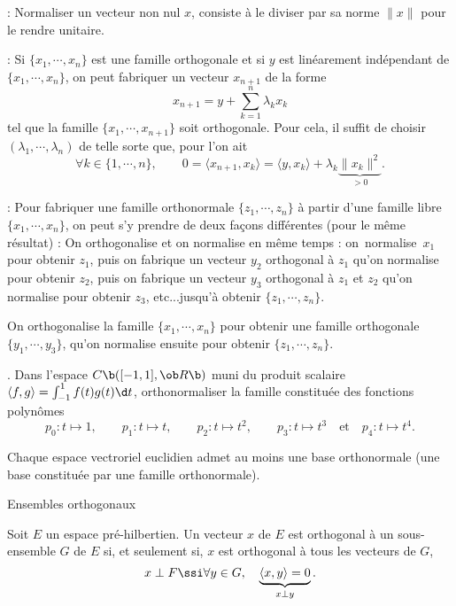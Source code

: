  : Normaliser un vecteur non nul $x$, consiste \`a le diviser par sa norme $\|x\|$ pour le rendre unitaire. 
\bigskip

: Si $\{x_1,\cdots,x_n\}$ est une famille orthogonale et si $y$ est lin\'earement ind\'ependant de $\{x_1,\cdots,x_n\}$, on peut fabriquer un vecteur $x_{n+1}$ de la forme 
$$
x_{n+1}=y+\sum_{k=1}^n\lambda_kx_k
$$ 
tel que la famille $\{x_1,\cdots,x_{n+1}\}$ soit orthogonale. Pour cela, il suffit de choisir $(\lambda_1,\cdots,\lambda_n)$ de telle sorte que, pour l'on ait
$$
\forall k\in\{1,\cdots,n\}, \qquad 0=\langle x_{n+1},x_k\rangle=\langle y,x_k\rangle+\lambda_k\underbrace{\|x_k\|^2}_{>0}.
$$

 : Pour fabriquer une famille orthonormale $\{z_1,\cdots,z_n\}$ \`a partir d'une famille libre $\{x_1,\cdots,x_n\}$, 
on peut s'y prendre de deux fa\c cons diff\'erentes (pour le m\^eme r\'esultat) :
\medskip
\noindent
{}
On orthogonalise et on normalise en m\^eme temps : on~normalise~$x_1$ pour obtenir $z_1$, puis on fabrique un vecteur $y_2$ orthogonal \`a $z_1$ qu'on normalise pour obtenir $z_2$, puis on fabrique un vecteur $y_3$ orthogonal \`a $z_1$ et $z_2$ qu'on normalise pour obtenir $z_3$, etc...jusqu'\`a obtenir $\{z_1,\cdots,z_n\}$. 

\medskip
{}
On orthogonalise la famille $\{x_1,\cdots,x_n\}$ pour obtenir une famille orthogonale $\{y_1,\cdots,y_3\}$, qu'on normalise ensuite pour obtenir $\{z_1,\cdots,z_n\}$. 

\bigskip
\Exercice. Dans l'espace $\sc C\b([-1,1],\ob R\b)$ muni du 
produit scalaire $\langle f,g\rangle=\int_{-1}^1f(t)g(t)\d t$, orthonormaliser 
la famille constitu\'ee des fonctions polyn\^omes 
$$
p_0:t\mapsto1, \qquad p_1:t\mapsto t, \qquad p_2:t\mapsto t^2, \qquad p_3:t\mapsto t^3\quad\mbox{et}\quad p_4:t\mapsto t^4.
$$ 

\Propriete []  Chaque espace vectroriel euclidien admet au moins une base orthonormale (une base constitu\'ee par une famille orthonormale). 
\bigskip


\Concept [] Ensembles orthogonaux


\Definition []  Soit $E$ un espace pr\'e-hilbertien. Un vecteur $x$ de $E$ est orthogonal \`a un sous-ensemble $G$ de $E$ si, 
et seulement si, $x$ est orthogonal \`a tous les vecteurs de $G$, 
$$
x\perp F \ssi \forall y\in G, \quad \underbrace{\langle x,y\rangle=0}_{x\perp y}. 
$$

